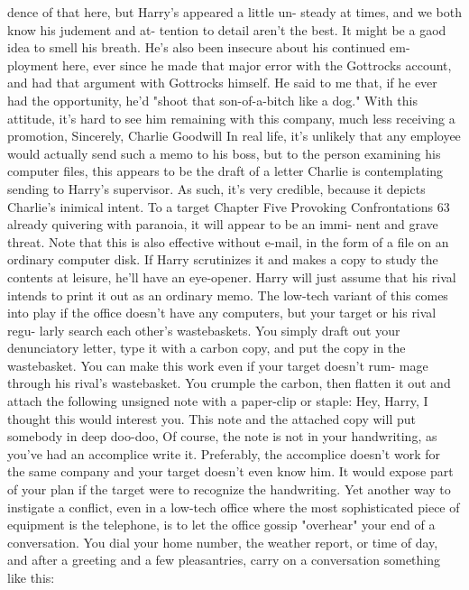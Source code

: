 \documentclass{book}
\begin{document}
dence of that here, but Harry's appeared a little un- 
steady at times, and we both know his judement and at- 
tention to detail aren't the best. It might be a gaod idea 
to smell his breath. 
He's also been insecure about his continued em- 
ployment here, ever since he made that major error 
with the Gottrocks account, and had that argument with 
Gottrocks himself. He said to me that, if he ever had the 
opportunity, he'd "shoot that son-of-a-bitch like a dog." 
With this attitude, it's hard to see him remaining 
with this company, much less receiving a promotion, 
Sincerely, 
Charlie Goodwill 
In real life, it's unlikely that any employee would actually 
send such a memo to his boss, but to the person examining his 
computer files, this appears to be the draft of a letter Charlie is 
contemplating sending to Harry's supervisor. As such, it's very 
credible, because it depicts Charlie's inimical intent. To a target 
Chapter Five 
Provoking Confrontations 
63 
already quivering with paranoia, it will appear to be an immi- 
nent and grave threat. 
Note that this is also effective without e-mail, in the form 
of a file on an ordinary computer disk. If Harry scrutinizes it 
and makes a copy to study the contents at leisure, he'll have an 
eye-opener. Harry will just assume that his rival intends to print 
it out as an ordinary memo. 
The low-tech variant of this comes into play if the office 
doesn't have any computers, but your target or his rival regu- 
larly search each other's wastebaskets. You simply draft out 
your denunciatory letter, type it with a carbon copy, and put the 
copy in the wastebasket. 
You can make this work even if your target doesn't rum- 
mage through his rival's wastebasket. You crumple the carbon, 
then flatten it out and attach the following unsigned note with a 
paper-clip or staple: 
Hey, Harry, 
I thought this would interest you. 
This note and the attached copy will put somebody in deep 
doo-doo, Of course, the note is not in your handwriting, as 
you've had an accomplice write it. Preferably, the accomplice 
doesn't work for the same company and your target doesn't even 
know him. It would expose part of your plan if the target were 
to recognize the handwriting. 
Yet another way to instigate a conflict, even in a low-tech 
office where the most sophisticated piece of equipment is the 
telephone, is to let the office gossip "overhear" your end of a 
conversation. You dial your home number, the weather report, 
or time of day, and after a greeting and a few pleasantries, carry 
on a conversation something like this:    
\end{document}
